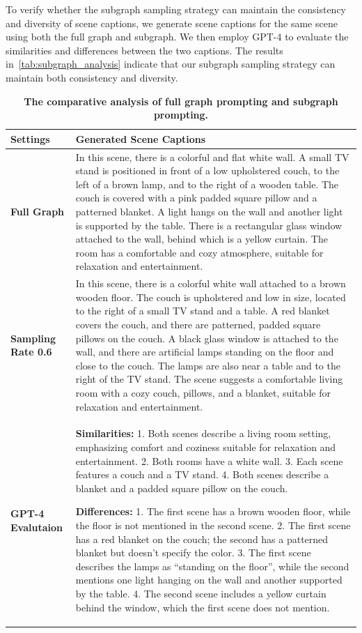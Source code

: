 To verify whether the subgraph sampling strategy can maintain the consistency and diversity of scene captions, we generate scene captions for the same scene using both the full graph and subgraph. We then employ GPT-4 \citep{openai2023gpt4} to evaluate the similarities and differences between the two captions.
The results in~\cref{tab:subgraph_analysis} indicate that our subgraph sampling strategy can maintain both consistency and diversity.

\begin{table}[t!]
    \centering
    \small
    \caption{\textbf{The comparative analysis of full graph prompting and subgraph prompting.}}
    \begin{tabular}{l|p{10cm}}
        \toprule
        \textbf{Settings} & \textbf{Generated Scene Captions}\\
        \midrule
        \textbf{Full Graph} & In this scene, there is a colorful and flat white wall. A small TV stand is positioned in front of a low upholstered couch, to the left of a brown lamp, and to the right of a wooden table. The couch is covered with a pink padded square pillow and a patterned blanket. A light hangs on the wall and another light is supported by the table. There is a rectangular glass window attached to the wall, behind which is a yellow curtain. The room has a comfortable and cozy atmosphere, suitable for relaxation and entertainment. \\
        \midrule
        \textbf{Sampling Rate 0.6} & In this scene, there is a colorful white wall attached to a brown wooden floor. The couch is upholstered and low in size, located to the right of a small TV stand and a table. A red blanket covers the couch, and there are patterned, padded square pillows on the couch. A black glass window is attached to the wall, and there are artificial lamps standing on the floor and close to the couch. The lamps are also near a table and to the right of the TV stand. The scene suggests a comfortable living room with a cozy couch, pillows, and a blanket, suitable for relaxation and entertainment. \\
        \midrule
        \textbf{GPT-4 Evalutaion} &  \textbf{Similarities:} 1. Both scenes describe a living room setting, emphasizing comfort and coziness suitable for relaxation and entertainment.
2. Both rooms have a white wall.
3. Each scene features a couch and a TV stand.
4. Both scenes describe a blanket and a padded square pillow on the couch.

\textbf{Differences:} 1. The first scene has a brown wooden floor, while the floor is not mentioned in the second scene.
2. The first scene has a red blanket on the couch; the second has a patterned blanket but doesn't specify the color.
3. The first scene describes the lamps as ``standing on the floor'', while the second mentions one light hanging on the wall and another supported by the table.
4. The second scene includes a yellow curtain behind the window, which the first scene does not mention.


\end{tabular}
\end{table}

